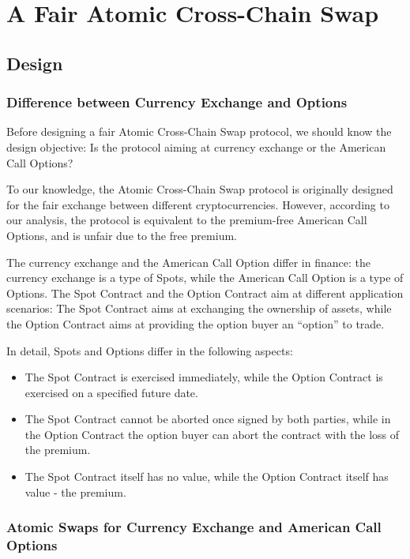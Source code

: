 \section{A Fair Atomic Cross-Chain Swap}
\label{sec:fair_atomic_swap}

\subsection{Design}

\subsubsection{Difference between Currency Exchange and Options}

Before designing a fair Atomic Cross-Chain Swap protocol, we should know the design objective:
Is the protocol aiming at currency exchange or the American Call Options?

To our knowledge, the Atomic Cross-Chain Swap protocol is originally designed for the fair exchange between different cryptocurrencies.
However, according to our analysis, the protocol is equivalent to the premium-free American Call Options, and is unfair due to the free premium.

The currency exchange and the American Call Option differ in finance: the currency exchange is a type of Spots, while the American Call Option is a type of Options.
The Spot Contract and the Option Contract aim at different application scenarios: The Spot Contract aims at exchanging the ownership of assets, while the Option Contract aims at providing the option buyer an ``option'' to trade.

In detail, Spots and Options differ in the following aspects:

\begin{itemize}
    \item The Spot Contract is exercised immediately, while the Option Contract is exercised on a specified future date.
    \item The Spot Contract cannot be aborted once signed by both parties, while in the Option Contract the option buyer can abort the contract with the loss of the premium.
    \item The Spot Contract itself has no value, while the Option Contract itself has value - the premium.
\end{itemize}

\subsubsection{Atomic Swaps for Currency Exchange and American Call Options}

